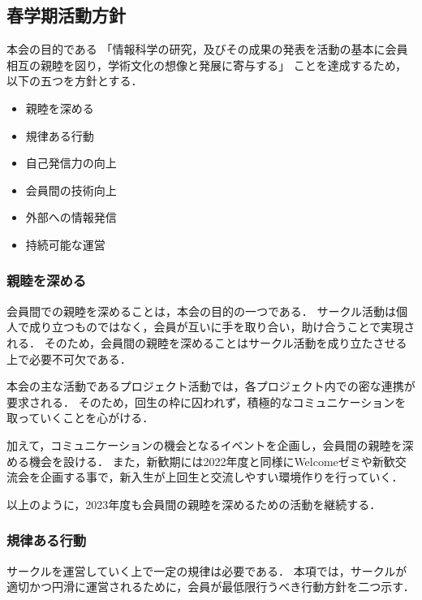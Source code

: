 \subsection*{春学期活動方針}


本会の目的である
「情報科学の研究，及びその成果の発表を活動の基本に会員相互の親睦を図り，学術文化の想像と発展に寄与する」
ことを達成するため，以下の五つを方針とする．

\begin{itemize}
  \item 親睦を深める
  \item 規律ある行動
  \item 自己発信力の向上
  \item 会員間の技術向上
  \item 外部への情報発信
  \item 持続可能な運営
\end{itemize}

\subsubsection*{親睦を深める}
会員間での親睦を深めることは，本会の目的の一つである．
サークル活動は個人で成り立つものではなく，会員が互いに手を取り合い，助け合うことで実現される．
そのため，会員間の親睦を深めることはサークル活動を成り立たさせる上で必要不可欠である．

本会の主な活動であるプロジェクト活動では，各プロジェクト内での密な連携が要求される．
そのため，回生の枠に囚われず，積極的なコミュニケーションを取っていくことを心がける．

加えて，コミュニケーションの機会となるイベントを企画し，会員間の親睦を深める機会を設ける．
また，新歓期には2022年度と同様にWelcomeゼミや新歓交流会を企画する事で，新入生が上回生と交流しやすい環境作りを行っていく．

以上のように，2023年度も会員間の親睦を深めるための活動を継続する．

\subsubsection*{規律ある行動}
サークルを運営していく上で一定の規律は必要である．
本項では，サークルが適切かつ円滑に運営されるために，会員が最低限行うべき行動方針を二つ示す．


